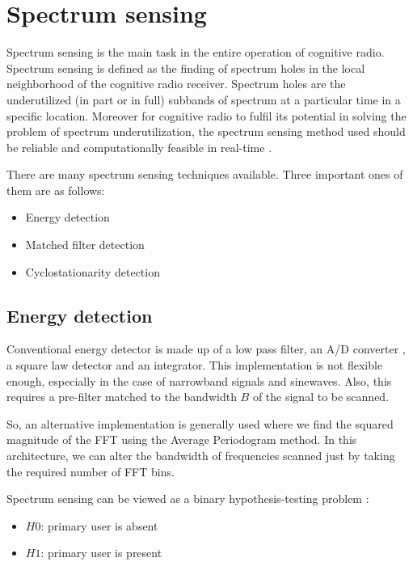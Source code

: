 \chapter{Spectrum sensing}

Spectrum sensing is the main task in the entire operation of cognitive
radio. Spectrum sensing is defined as the finding of spectrum holes in 
the local neighborhood of the cognitive radio receiver. Spectrum holes are the
underutilized (in part or in full) subbands of spectrum at a particular time
in a specific location. Moreover for cognitive radio to fulfil its potential
in solving the problem of spectrum underutilization, the spectrum sensing 
method used should be reliable and computationally feasible in real-time 
\cite{haykin09}.

There are many spectrum sensing techniques available. Three important ones of
them are as follows:
\begin{itemize}
    \item Energy detection
    \item Matched filter detection
    \item Cyclostationarity detection
\end{itemize}

\section{Energy detection}

Conventional energy detector is made up of a low pass filter, an A/D converter
, a square law detector and an integrator. This implementation is not flexible
enough, especially in the case of narrowband signals and sinewaves. Also, this
requires a pre-filter matched to the bandwidth $B$ of the signal to be 
scanned.

So, an alternative implementation is generally used where we find the squared 
magnitude of the FFT using the Average Periodogram method. In this 
architecture, we can alter the bandwidth of frequencies scanned just by taking
the required number of FFT bins. 

Spectrum sensing can be viewed as a binary hypothesis-testing problem 
\cite{zhang09}:
\begin{itemize}
    \item $H0$: primary user is absent
    \item $H1$: primary user is present
\end{itemize}



